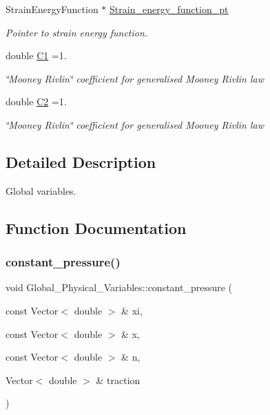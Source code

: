 \begin{DoxyCompactItemize}
Strain\+Energy\+Function $\ast$ \hyperlink{namespaceGlobal__Physical__Variables_a73135f793690b4386bf83bbefc7bf310}{Strain\+\_\+energy\+\_\+function\+\_\+pt}
\begin{DoxyCompactList}\small\item\em Pointer to strain energy function. \end{DoxyCompactList}\item 
double \hyperlink{namespaceGlobal__Physical__Variables_a849754fa7155c1a31481674ce4845658}{C1} =1.
\begin{DoxyCompactList}\small\item\em \char`\"{}\+Mooney Rivlin\char`\"{} coefficient for generalised Mooney Rivlin law \end{DoxyCompactList}\item 
double \hyperlink{namespaceGlobal__Physical__Variables_af9defd1b5745cce50d2c386b3ac0e0ae}{C2} =1.
\begin{DoxyCompactList}\small\item\em \char`\"{}\+Mooney Rivlin\char`\"{} coefficient for generalised Mooney Rivlin law \end{DoxyCompactList}\end{DoxyCompactItemize}


\subsection{Detailed Description}
Global variables. 

\subsection{Function Documentation}
\mbox{\label{namespaceGlobal__Physical__Variables_a19f4e20a92e7d216b4d2b00308f96917}} 
\subsubsection{\texorpdfstring{constant\+\_\+pressure()}{constant\_pressure()}}
{\footnotesize\ttfamily void Global\+\_\+\+Physical\+\_\+\+Variables\+::constant\+\_\+pressure (\begin{DoxyParamCaption}\item[{const Vector$<$ double $>$ \&}]{xi,  }\item[{const Vector$<$ double $>$ \&}]{x,  }\item[{const Vector$<$ double $>$ \&}]{n,  }\item[{Vector$<$ double $>$ \&}]{traction }\end{DoxyParamCaption})}



